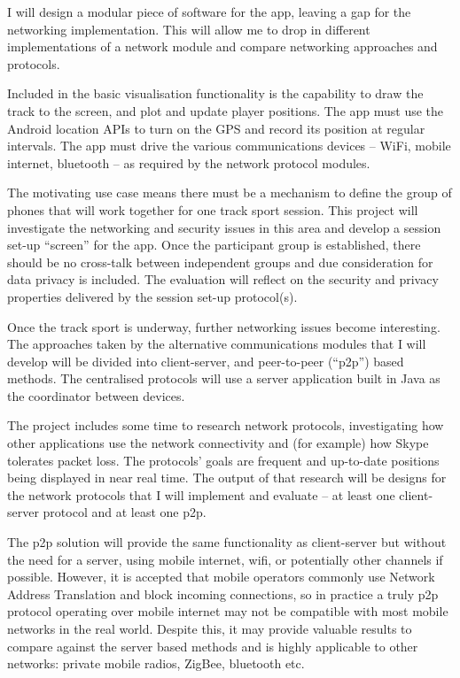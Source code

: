 \documentclass[12pt,twoside,notitlepage]{report}
\begin{document}
I will design a modular piece of software for the app, leaving a gap for the networking implementation.  This will allow me to drop in different implementations of a network module and compare networking approaches and protocols.

Included in the basic visualisation functionality is the capability to draw the track to the screen, and plot and update player positions.  The app must use the Android location APIs to turn on the GPS and record its position at regular intervals.  The app must drive the various communications devices -- WiFi, mobile internet, bluetooth -- as required by the network protocol modules.

The motivating use case means there must be a mechanism to define the group of phones that will work together for one track sport session.  This project will investigate the networking and security issues in this area and develop a session set-up ``screen'' for the app.  Once the participant group is established, there should be no cross-talk between independent groups and due consideration for data privacy is included.  The evaluation will reflect on the security and privacy properties delivered by the session set-up protocol(s).

Once the track sport is underway, further networking issues become interesting.  The approaches taken by the alternative communications modules that I will develop will be divided into client-server, and peer-to-peer (``p2p'') based methods.  The centralised protocols will use a server application built in Java as the coordinator between devices.

The project includes some time to research network protocols, investigating how other applications use the network connectivity and (for example) how Skype tolerates packet loss.  The protocols' goals are frequent and up-to-date positions being displayed in near real time.  The output of that research will be designs for the network protocols that I will implement and evaluate -- at least one client-server protocol and at least one p2p.

The p2p solution will provide the same functionality as client-server but without the need for a server, using mobile internet, wifi, or potentially other channels if possible.  However, it is accepted that mobile operators commonly use Network Address Translation and block incoming connections, so in practice a truly p2p protocol operating over mobile internet may not be compatible with most mobile networks in the real world. Despite this, it may provide valuable results to compare against the server based methods and is highly applicable to other networks: private mobile radios, ZigBee, bluetooth etc.
\end{document}
